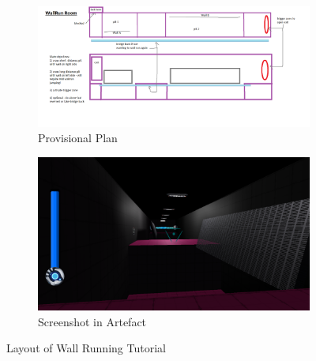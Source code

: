 \begin{figure}[H]
\centering
\begin{subfigure}{0.5\textwidth}
  \centering
  \includegraphics[width=1\linewidth]{Figures/wallplan.png}
  \caption{Provisional Plan}
\end{subfigure}%
\begin{subfigure}{0.5\textwidth}
  \centering
  \includegraphics[width=1\linewidth]{Figures/wall.png}
  \caption{Screenshot in Artefact}
\end{subfigure}
\caption{Layout of Wall Running Tutorial}
\end{figure}

